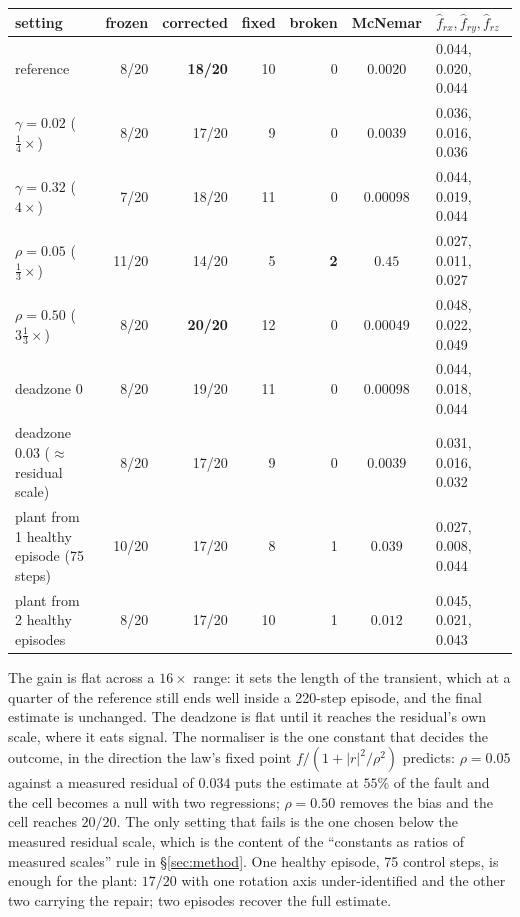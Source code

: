 \documentclass{article}
\begin{document}
\begin{center}\small
\begin{tabular}{lrrrrcl}
\toprule
setting & frozen & corrected & fixed & broken & McNemar & $\hat f_{rx},\hat f_{ry},\hat f_{rz}$ \\
\midrule
reference & 8/20 & \textbf{18/20} & 10 & 0 & $0.0020$ & 0.044, 0.020, 0.044 \\
$\gamma=0.02$ ($\tfrac14\times$) & 8/20 & 17/20 & 9 & 0 & $0.0039$ & 0.036, 0.016, 0.036 \\
$\gamma=0.32$ ($4\times$) & 7/20 & 18/20 & 11 & 0 & $0.00098$ & 0.044, 0.019, 0.044 \\
$\rho=0.05$ ($\tfrac13\times$) & 11/20 & 14/20 & 5 & \textbf{2} & $0.45$ & 0.027, 0.011, 0.027 \\
$\rho=0.50$ ($3\tfrac13\times$) & 8/20 & \textbf{20/20} & 12 & 0 & $0.00049$ & 0.048, 0.022, 0.049 \\
deadzone $0$ & 8/20 & 19/20 & 11 & 0 & $0.00098$ & 0.044, 0.018, 0.044 \\
deadzone $0.03$ ($\approx$ residual scale) & 8/20 & 17/20 & 9 & 0 & $0.0039$ & 0.031, 0.016, 0.032 \\
plant from 1 healthy episode (75 steps) & 10/20 & 17/20 & 8 & 1 & $0.039$ & 0.027, 0.008, 0.044 \\
plant from 2 healthy episodes & 8/20 & 17/20 & 10 & 1 & $0.012$ & 0.045, 0.021, 0.043 \\
\bottomrule
\end{tabular}
\end{center}

The gain is flat across a $16\times$ range: it sets the length of the transient, which at a
quarter of the reference still ends well inside a 220-step episode, and the final estimate is
unchanged. The deadzone is flat until it reaches the residual's own scale, where it eats
signal. The normaliser is the one constant that decides the outcome, in the direction the
law's fixed point $f/(1+|r|^2/\rho^2)$ predicts: $\rho=0.05$ against a measured residual of
$0.034$ puts the estimate at $55\%$ of the fault and the cell becomes a null with two
regressions; $\rho=0.50$ removes the bias and the cell reaches $20/20$. The only setting that
fails is the one chosen below the measured residual scale, which is the content of the
``constants as ratios of measured scales'' rule in \S\ref{sec:method}. One healthy episode,
75 control steps, is enough for the plant: $17/20$ with one rotation axis under-identified
and the other two carrying the repair; two episodes recover the full estimate.
\end{document}

